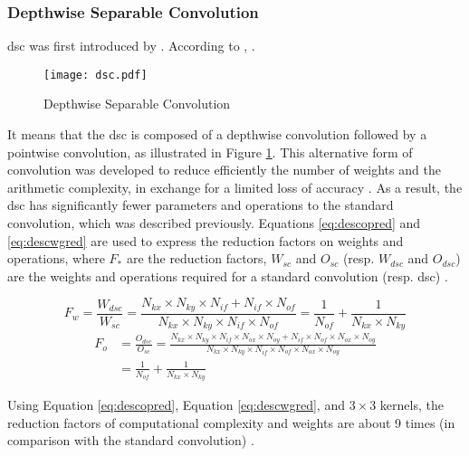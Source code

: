 \subsubsection{Depthwise Separable Convolution}  \label{subs:dsc}
\acrfull{dsc} was first introduced by \textcite{sifre_rigid-motion_2014}. According to \textcite{chollet_xception_2017}, .
%
\begin{figure}[ht]
    \texttt{[image: dsc.pdf]}
    \caption{Depthwise Separable Convolution}
    \label{fig:dsc}
\end{figure}

It means that the \acrshort{dsc} is composed of a depthwise convolution followed by a pointwise convolution, as illustrated in Figure \ref{fig:dsc}. This alternative form of convolution was developed to reduce efficiently the number of weights and the arithmetic complexity, in exchange for a limited loss of accuracy \cite{liu_fpga-based_2019}. As a result, the \acrshort{dsc} has significantly fewer parameters and operations to the standard convolution, which was described previously. Equations \eqref{eq:descopred} and \eqref{eq:descwgred} are used to express the reduction factors on weights and operations, where $F_{*}$ are the reduction factors, $W_{sc}$ and $O_{sc}$ (resp. $W_{dsc}$ and $O_{dsc}$) are the weights and operations required for a standard convolution (resp. \acrshort{dsc}) \cite{liu_fpga-based_2019, bai_cnn_2018}.

\begin{equation}
    F_w = \frac{W_{dsc}}{W_{sc}} =
    \frac{N_{kx} \times N_{ky} \times N_{if} + N_{if} \times N_{of}}{N_{kx} \times N_{ky} \times N_{if} \times N_{of}} =
    \frac{1}{N_{of}} + \frac{1}{N_{kx} \times N_{ky}}
    \label{eq:descopred}
\end{equation}
%
\begin{equation}
    \begin{split}
        F_o &= \frac{O_{dsc}}{O_{sc}} = \frac{N_{kx} \times N_{ky} \times N_{if} \times N_{ox} \times N_{oy} + N_{if} \times N_{of} \times N_{ox} \times N_{oy}}{N_{kx} \times N_{ky} \times N_{if} \times N_{of} \times N_{ox} \times N_{oy}} \\
        &= \frac{1}{N_{of}} + \frac{1}{N_{kx} \times N_{ky}}
    \end{split}
    \label{eq:descwgred}
\end{equation}

Using Equation \eqref{eq:descopred}, Equation \eqref{eq:descwgred}, and $3 \times 3$ kernels, the reduction factors of computational complexity and weights are about 9 times (in comparison with the standard convolution) \cite{zhang_channel_2019}.